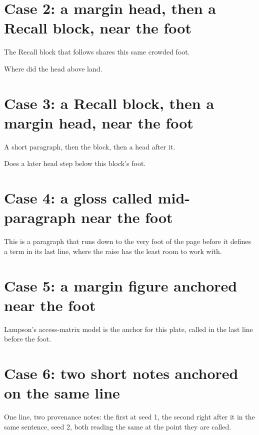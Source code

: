 \newpage
\section*{Case 2: a margin head, then a Recall block, near the foot}
\noindent The Recall block that follows shares this same crowded foot.
\begin{pdrecitation}
  \item Where did the head above land.
\end{pdrecitation}

\newpage
\section*{Case 3: a Recall block, then a margin head, near the foot}
\noindent A short paragraph, then the block, then a head after it.
\begin{pdrecitation}
  \item Does a later head step below this block's foot.
\end{pdrecitation}

\newpage
\section*{Case 4: a gloss called mid-paragraph near the foot}
\noindent This is a paragraph that runs down to the very foot of the page before it defines a  term in its last line, where the raise has the least room to work with.

\newpage
\section*{Case 5: a margin figure anchored near the foot}
\noindent Lampson's access-matrix model is the anchor for this plate, called in the last line before the foot.

\newpage
\section*{Case 6: two short notes anchored on the same line}
\noindent One line, two provenance notes: the first at seed 1, the second right after it in the same sentence, seed 2, both reading the same \texttt{\string\pagetotal} at the point they are called.
